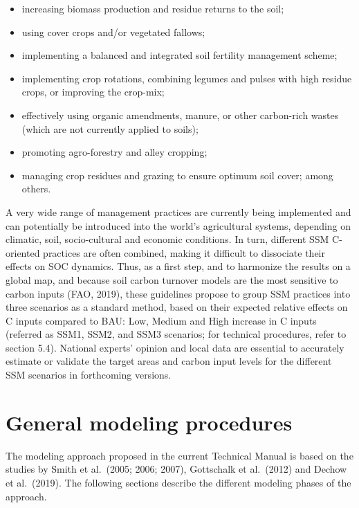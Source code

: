 \documentclass[
  10pt,
  b5paper,
]{book}
\providecommand{\tightlist}{%
  \setlength{\itemsep}{0pt}\setlength{\parskip}{0pt}}
\begin{document}
\begin{itemize}
\tightlist
\item
  increasing biomass production and residue returns to the soil;
\item
  using cover crops and/or vegetated fallows;
\item
  implementing a balanced and integrated soil fertility management scheme;
\item
  implementing crop rotations, combining legumes and pulses with high residue crops, or improving the crop-mix;
\item
  effectively using organic amendments, manure, or other carbon-rich wastes (which are not currently applied to soils);
\item
  promoting agro-forestry and alley cropping;
\item
  managing crop residues and grazing to ensure optimum soil cover; among others.
\end{itemize}

A very wide range of management practices are currently being implemented and can potentially be introduced into the world's agricultural systems, depending on climatic, soil, socio-cultural and economic conditions. In turn, different SSM C-oriented practices are often combined, making it difficult to dissociate their effects on SOC dynamics. Thus, as a first step, and to harmonize the results on a global map, and because soil carbon turnover models are the most sensitive to carbon inputs (FAO, 2019), these guidelines propose to group SSM practices into three scenarios as a standard method, based on their expected relative effects on C inputs compared to BAU: Low, Medium and High increase in C inputs (referred as SSM1, SSM2, and SSM3 scenarios; for technical procedures, refer to section 5.4). National experts' opinion and local data are essential to accurately estimate or validate the target areas and carbon input levels for the different SSM scenarios in forthcoming versions.

\hypertarget{general-modeling-procedures}{%
\section{General modeling procedures}\label{general-modeling-procedures}}

The modeling approach proposed in the current Technical Manual is based on the studies by Smith et al.~(2005; 2006; 2007), Gottschalk et al.~(2012) and Dechow et al.~(2019). The following sections describe the different modeling phases of the approach.
\end{document}
